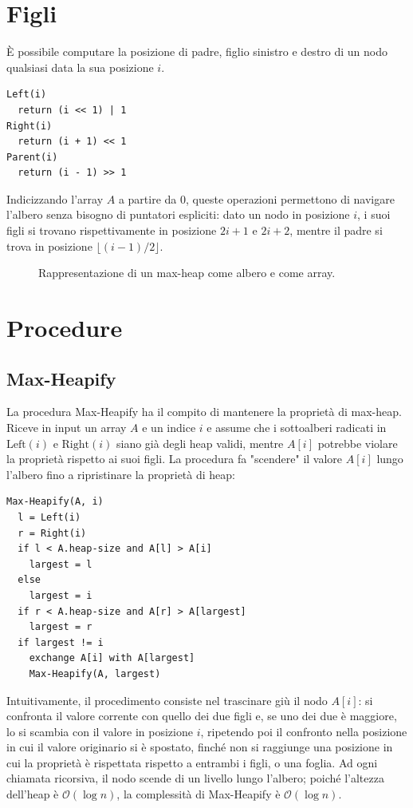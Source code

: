 \section{Figli \label{sec:figli}}
È possibile computare la posizione di padre, figlio sinistro e destro di un nodo qualsiasi data la sua posizione $i$.
\lstset{stringstyle=\ttfamily}
\begin{lstlisting}[caption={Operazioni},label=lst:multicorrelation]
Left(i)
  return (i << 1) | 1
Right(i)
  return (i + 1) << 1
Parent(i)
  return (i - 1) >> 1
\end{lstlisting}
Indicizzando l'array $A$ a partire da $0$, queste operazioni permettono di navigare l'albero senza bisogno di puntatori espliciti: dato un nodo in posizione $i$, i suoi figli si trovano rispettivamente in posizione $2i + 1$ e $2i + 2$, mentre il padre si trova in posizione $\lfloor (i-1)/2 \rfloor$.

\begin{figure}[h]
  \centering
  
  \caption{Rappresentazione di un max-heap come albero e come array.}
\end{figure}

\section{Procedure \label{sec:procedure}}
\subsection{Max-Heapify}
La procedura Max-Heapify ha il compito di mantenere la proprietà di max-heap. Riceve in input un array $A$ e un indice $i$ e assume che i sottoalberi radicati in $\text{Left}(i)$ e $\text{Right}(i)$ siano già degli heap validi, mentre $A[i]$ potrebbe violare la proprietà rispetto ai suoi figli. La procedura fa "scendere" il valore $A[i]$ lungo l'albero fino a ripristinare la proprietà di heap:
\begin{lstlisting}[caption={Max-Heapify},label=lst:max-heapify,escapechar=|]
Max-Heapify(A, i)
  l = Left(i)
  r = Right(i)
  if l < A.heap-size and A[l] > A[i]
    largest = l
  else
    largest = i
  if r < A.heap-size and A[r] > A[largest]
    largest = r
  if largest != i
    exchange A[i] with A[largest]
    Max-Heapify(A, largest)
\end{lstlisting}

Intuitivamente, il procedimento consiste nel trascinare giù il nodo $A[i]$: si confronta il valore corrente con quello dei due figli e, se uno dei due è maggiore, lo si scambia con il valore in posizione $i$, ripetendo poi il confronto nella posizione in cui il valore originario si è spostato, finché non si raggiunge una posizione in cui la proprietà è rispettata rispetto a entrambi i figli, o una foglia. Ad ogni chiamata ricorsiva, il nodo scende di un livello lungo l'albero; poiché l'altezza dell'heap è $\mathcal{O}(\log n)$, la complessità di Max-Heapify è $\mathcal{O}(\log n)$.

